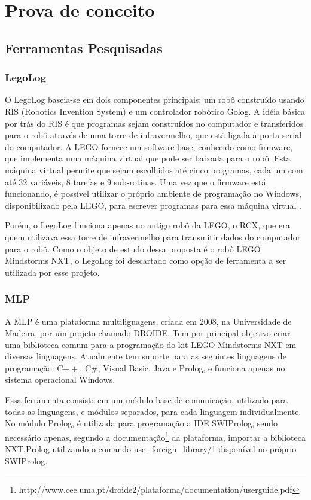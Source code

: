 \chapter{Prova de conceito}
\section{Ferramentas Pesquisadas}
\subsection{LegoLog}
O LegoLog baseia-se em dois componentes principais: um robô construído usando RIS (Robotics Invention System) e um controlador robótico Golog. A idéia básica por trás do RIS é que programas sejam construídos no computador e transferidos para o robô através de uma torre de infravermelho, que está ligada à porta serial do computador. A LEGO fornece um software base, conhecido como firmware, que implementa uma máquina virtual que pode ser baixada para o robô.  Esta máquina virtual permite que sejam escolhidos até cinco programas, cada um com até 32 variáveis, 8 tarefas e 9 sub-rotinas. Uma vez que o firmware está funcionando, é possível utilizar o próprio ambiente de programação no Windows, disponibilizado pela LEGO, para escrever programas para essa máquina virtual \cite{levesque2000legolog}. 

Porém, o LegoLog funciona apenas no antigo robô da LEGO, o RCX, que era quem utilizava essa torre de infravermelho para transmitir dados do computador para o robô. Como o objeto de estudo dessa proposta é o robô LEGO Mindstorms NXT, o LegoLog foi descartado como opção de ferramenta a ser utilizada por esse projeto.

\subsection{MLP}
A MLP é uma plataforma multiliguagens, criada em 2008, na Universidade de Madeira, por um projeto chamado DROIDE. Tem por principal objetivo criar uma biblioteca comum para a programação do kit LEGO Mindstorms NXT em diversas linguagens. Atualmente tem suporte para as seguintes linguagens de programação: C$++$, C\#, Visual Basic, Java e Prolog, e funciona apenas no sistema operacional Windows. 

Essa ferramenta consiste em um módulo base de comunicação, utilizado para todas as linguagens, e módulos separados, para cada linguagem individualmente. No módulo Prolog, é utilizada para programação a IDE SWIProlog, sendo necessário apenas, segundo a documentação\footnote{http://www.cee.uma.pt/droide2/plataforma/documentation/userguide.pdf} da plataforma, importar a biblioteca NXT.Prolog utilizando o comando use\_foreign\_library$/$1 disponível no próprio SWIProlog. 

